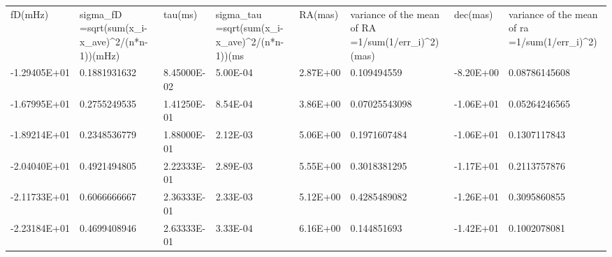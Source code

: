 \documentclass[useAMS,usenatbib]{mn2e}
\begin{document}
\begin{table}[h]
\begin{tabular}{llllllll}
fD(mHz)      & sigma\_fD =sqrt(sum(x\_i-x\_ave)\textasciicircum 2/(n*n-1))(mHz) & tau(ms)     & sigma\_tau =sqrt(sum(x\_i-x\_ave)\textasciicircum 2/(n*n-1))(ms & RA(mas)  & variance of the mean of RA =1/sum(1/err\_i)\textasciicircum 2)(mas) & dec(mas)  & variance of the mean of ra =1/sum(1/err\_i)\textasciicircum 2) \\
-1.29405E+01 & 0.1881931632                                                     & 8.45000E-02 & 5.00E-04                                                        & 2.87E+00 & 0.109494559                                                         & -8.20E+00 & 0.08786145608                                                  \\
-1.67995E+01 & 0.2755249535                                                     & 1.41250E-01 & 8.54E-04                                                        & 3.86E+00 & 0.07025543098                                                       & -1.06E+01 & 0.05264246565                                                  \\
-1.89214E+01 & 0.2348536779                                                     & 1.88000E-01 & 2.12E-03                                                        & 5.06E+00 & 0.1971607484                                                        & -1.06E+01 & 0.1307117843                                                   \\
-2.04040E+01 & 0.4921494805                                                     & 2.22333E-01 & 2.89E-03                                                        & 5.55E+00 & 0.3018381295                                                        & -1.17E+01 & 0.2113757876                                                   \\
-2.11733E+01 & 0.6066666667                                                     & 2.36333E-01 & 2.33E-03                                                        & 5.12E+00 & 0.4285489082                                                        & -1.26E+01 & 0.3095860855                                                   \\
-2.23184E+01 & 0.4699408946                                                     & 2.63333E-01 & 3.33E-04                                                        & 6.16E+00 & 0.144851693                                                         & -1.42E+01 & 0.1002078081                                                   \\

\end{tabular}
\end{table}
\end{document}
